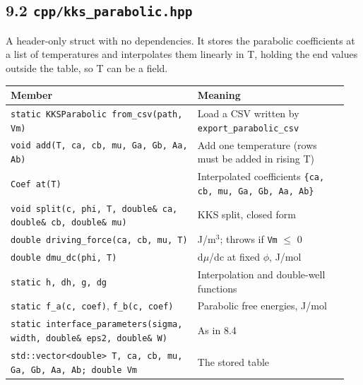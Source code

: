 \documentclass[12pt,a4paper]{article}
\begin{document}
\subsection*{9.2 \texttt{cpp/\allowbreak{}kks\_\allowbreak{}parabolic.\allowbreak{}hpp}}
A header-only struct with no dependencies. It stores the parabolic coefficients at a list of temperatures and interpolates them linearly in T, holding the end values outside the table, so T can be a field.

\begingroup\small
\begin{longtable}{>{\raggedright\arraybackslash}p{0.520\linewidth}>{\raggedright\arraybackslash}p{0.427\linewidth}}
\toprule
\textbf{Member} & \textbf{Meaning} \\
\midrule
\endhead
\texttt{static KKSParabolic from\_\allowbreak{}csv(path,\allowbreak{} Vm)} & Load a CSV written by \texttt{export\_\allowbreak{}parabolic\_\allowbreak{}csv} \\
\texttt{void add(T,\allowbreak{} ca,\allowbreak{} cb,\allowbreak{} mu,\allowbreak{} Ga,\allowbreak{} Gb,\allowbreak{} Aa,\allowbreak{} Ab)} & Add one temperature (rows must be added in rising T) \\
\texttt{Coef at(T)} & Interpolated coefficients \texttt{\{ca,\allowbreak{} cb,\allowbreak{} mu,\allowbreak{} Ga,\allowbreak{} Gb,\allowbreak{} Aa,\allowbreak{} Ab\}} \\
\texttt{void split(c,\allowbreak{} phi,\allowbreak{} T,\allowbreak{} double\& ca,\allowbreak{} double\& cb,\allowbreak{} double\& mu)} & KKS split, closed form \\
\texttt{double driving\_\allowbreak{}force(ca,\allowbreak{} cb,\allowbreak{} mu,\allowbreak{} T)} & J/m\(^{3}\); throws if \texttt{Vm} \(\le\) 0 \\
\texttt{double dmu\_\allowbreak{}dc(phi,\allowbreak{} T)} & d\(\mu\)/dc at fixed \(\phi\), J/mol \\
\texttt{static h,\allowbreak{} dh,\allowbreak{} g,\allowbreak{} dg} & Interpolation and double-well functions \\
\texttt{static f\_\allowbreak{}a(c,\allowbreak{} coef)}, \texttt{f\_\allowbreak{}b(c,\allowbreak{} coef)} & Parabolic free energies, J/mol \\
\texttt{static interface\_\allowbreak{}parameters(sigma,\allowbreak{} width,\allowbreak{} double\& eps2,\allowbreak{} double\& W)} & As in 8.4 \\
\texttt{std::vector\textless{}double\textgreater{} T,\allowbreak{} ca,\allowbreak{} cb,\allowbreak{} mu,\allowbreak{} Ga,\allowbreak{} Gb,\allowbreak{} Aa,\allowbreak{} Ab; double Vm} & The stored table \\
\bottomrule
\end{longtable}
\endgroup
\end{document}
